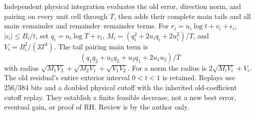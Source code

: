 Independent physical integration evaluates the old error, direction norm,
and pairing on every unit cell through $T$, then adds their complete main
tails and all main--remainder and remainder--remainder terms. For
$r_i=u_i\log t+v_i+\epsilon_i$, $|\epsilon_i|\le B_i/t$, set
$q_i=u_i\log T+v_i$, $M_i=(q_i^2+2u_iq_i+2u_i^2)/T$, and
$V_i=B_i^2/(3T^3)$. The tail pairing main term is
\[
 (q_1q_2+u_1q_2+u_2q_1+2u_1u_2)/T
\]
with radius $\sqrt{M_1V_2}+\sqrt{M_2V_1}+\sqrt{V_1V_2}$.
For a norm the radius is $2\sqrt{M_iV_i}+V_i$. The old residual's entire
exterior interval $0<t<1$ is retained. Replays use 256/384 bits and a
doubled physical cutoff with the inherited old-coefficient cutoff replay.
They establish a finite feasible decrease, not a new best error, eventual
gain, or proof of RH. Review is by the author only.
